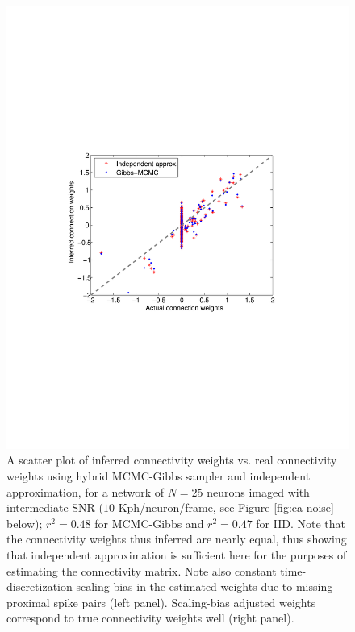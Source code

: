 \begin{figure}
\begin{minipage}[c]{0.45\hsize}
\includegraphics[width=\hsize]{../figs/Figure1b_fluor_mcmc_vs_iid}
\end{minipage}
\caption{A scatter plot of inferred connectivity weights vs. real connectivity weights
using hybrid MCMC-Gibbs sampler and independent approximation, for a network of $N=25$ neurons imaged
with intermediate SNR ($10$ Kph/neuron/frame, see Figure \ref{fig:ca-noise} below); $r^2=0.48$ for MCMC-Gibbs and
$r^2=0.47$ for IID. Note that the connectivity weights thus inferred are nearly equal, thus showing that independent approximation is sufficient here for the purposes of estimating the connectivity matrix. Note also constant time-discretization scaling bias in the estimated weights due to missing proximal spike pairs (left panel). 
Scaling-bias adjusted weights correspond to true connectivity weights well (right panel).}
\label{fig:mcmc-iid}
\end{figure}

